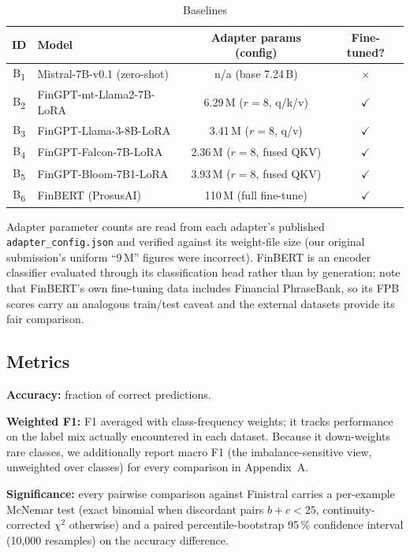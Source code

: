 \documentclass[a4paper]{article}
\begin{document}
\begin{table}[htbp]
\centering
\caption{Baselines}
\label{tab:baselines}
\begin{tabular}{clcc}
\toprule
\textbf{ID} & \textbf{Model} & \textbf{Adapter params (config)} & \textbf{Fine-tuned?} \\
\midrule
B\textsubscript{1} & Mistral-7B-v0.1 (zero-shot)  & n/a (base 7.24\,B) & $\times$ \\
B\textsubscript{2} & FinGPT-mt-Llama2-7B-LoRA  & 6.29\,M ($r{=}8$, q/k/v) & $\checkmark$ \\
B\textsubscript{3} & FinGPT-Llama-3-8B-LoRA    & 3.41\,M ($r{=}8$, q/v) & $\checkmark$ \\
B\textsubscript{4} & FinGPT-Falcon-7B-LoRA     & 2.36\,M ($r{=}8$, fused QKV) & $\checkmark$ \\
B\textsubscript{5} & FinGPT-Bloom-7B1-LoRA     & 3.93\,M ($r{=}8$, fused QKV) & $\checkmark$ \\
B\textsubscript{6} & FinBERT (ProsusAI)        & 110\,M (full fine-tune) & $\checkmark$ \\
\bottomrule
\end{tabular}
\par\smallskip
{\footnotesize Adapter parameter counts are read from each adapter's published \texttt{adapter\_config.json} and verified against its weight-file size (our original submission's uniform ``9\,M'' figures were incorrect). FinBERT is an encoder classifier evaluated through its classification head rather than by generation; note that FinBERT's own fine-tuning data includes Financial PhraseBank, so its FPB scores carry an analogous train/test caveat and the external datasets provide its fair comparison.}
\end{table}

\subsection{Metrics}

\textbf{Accuracy:} fraction of correct predictions.

\textbf{Weighted F1:} F1 averaged with class-frequency weights; it tracks performance on the label mix actually encountered in each dataset. Because it down-weights rare classes, we additionally report macro F1 (the imbalance-sensitive view, unweighted over classes) for every comparison in Appendix~A.

\textbf{Significance:} every pairwise comparison against Finistral carries a per-example McNemar test (exact binomial when discordant pairs $b{+}c<25$, continuity-corrected $\chi^2$ otherwise) and a paired percentile-bootstrap 95\,\% confidence interval (10{,}000 resamples) on the accuracy difference.
\end{document}

